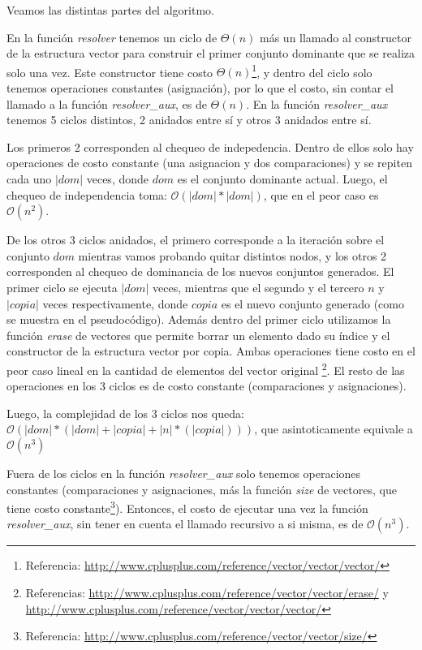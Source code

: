 Veamos las distintas partes del algoritmo.

En la función \textit{resolver} tenemos un ciclo de $\Theta(n)$ más un llamado al constructor de la estructura vector para construir el primer conjunto dominante que se realiza solo una vez. Este constructor tiene costo $\Theta(n)$\footnote{Referencia: \url{http://www.cplusplus.com/reference/vector/vector/vector/}}, y dentro del ciclo solo tenemos operaciones constantes (asignación), por lo que el costo, sin contar el llamado a la función \textit{resolver_aux}, es de $\Theta(n)$.
En la función \textit{resolver_aux} tenemos 5 ciclos distintos, 2 anidados entre sí y otros 3 anidados entre sí.

Los primeros 2 corresponden al chequeo de indepedencia. Dentro de ellos solo hay operaciones de costo constante (una asignacion y dos comparaciones) y se repiten cada uno $|dom|$ veces, donde $dom$ es el conjunto dominante actual. Luego, el chequeo de independencia toma: $\mathcal{O}(|dom|*|dom|)$, que en el peor caso es $\mathcal{O}(n^2)$.

De los otros 3 ciclos anidados, el primero corresponde a la iteración sobre el conjunto $dom$ mientras vamos probando quitar distintos nodos, y los otros 2 corresponden al chequeo de dominancia de los nuevos conjuntos generados.
El primer ciclo se ejecuta $|dom|$ veces, mientras que el segundo y el tercero $n$ y $|copia|$ veces respectivamente, donde $copia$ es el nuevo conjunto generado (como se muestra en el pseudocódigo). Además dentro del primer ciclo utilizamos la función \textit{erase} de vectores que permite borrar un elemento dado su índice y el constructor de la estructura vector por copia. Ambas operaciones tiene costo en el peor caso lineal en la cantidad de elementos del vector original \footnote{Referencias: \url{http://www.cplusplus.com/reference/vector/vector/erase/} y \url{http://www.cplusplus.com/reference/vector/vector/vector/}}. El resto de las operaciones en los 3 ciclos es de costo constante (comparaciones y asignaciones).

Luego, la complejidad de los 3 ciclos nos queda: $\mathcal{O}(|dom|*(|dom| + |copia| + |n|* (|copia|)))$, que asintoticamente equivale a $\mathcal{O}(n^3)$

Fuera de los ciclos en la función \textit{resolver_aux} solo tenemos operaciones constantes (comparaciones y asignaciones, más la función \textit{size} de vectores, que tiene costo constante\footnote{Referencia: \url{http://www.cplusplus.com/reference/vector/vector/size/}}). Entonces, el costo de ejecutar una vez la función \textit{resolver_aux}, sin tener en cuenta el llamado recursivo a si misma, es de $\mathcal{O}(n^3)$.


